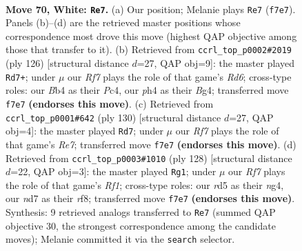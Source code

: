 \documentclass[11pt]{article}
\begin{document}
\clearpage

\begin{figure}[p]\centering
\begin{subfigure}{0.46\textwidth}\centering
\resizebox{\linewidth}{!}{%
\newchessgame
\chessboard[
  setfen={6k1/3n1R2/8/3r4/pB3P1p/P6P/4K3/8 w - - 3 70},
  showmover=false,
  pgfstyle=straightmove, color=movearrow, markmove={f7-e7}
]}
\caption{}
\end{subfigure}\hfill
\begin{subfigure}{0.46\textwidth}\centering
\resizebox{\linewidth}{!}{%
\newchessgame
\chessboard[
  setfen={1r1n4/5k2/3R4/p1p1P3/2P3B1/1P4P1/6K1/8 w - - 1 64},
  showmover=false,
  pgfstyle=straightmove, color=movearrow, markmove={d6-d7}
]}
\caption{}
\end{subfigure}
\\[4pt]
\begin{subfigure}{0.46\textwidth}\centering
\resizebox{\linewidth}{!}{%
\newchessgame
\chessboard[
  setfen={7k/4R2p/3n2p1/8/3r2PP/5P1K/4B3/8 w - - 1 66},
  showmover=false,
  pgfstyle=straightmove, color=movearrow, markmove={e7-d7}
]}
\caption{}
\end{subfigure}\hfill
\begin{subfigure}{0.46\textwidth}\centering
\resizebox{\linewidth}{!}{%
\newchessgame
\chessboard[
  setfen={5r2/1K2k1p1/4P3/7P/1p4n1/1Bp5/P7/5R2 w - - 2 65},
  showmover=false,
  pgfstyle=straightmove, color=movearrow, markmove={f1-g1}
]}
\caption{}
\end{subfigure}
\caption{\textbf{Move 70, White: \texttt{Re7}.} (a) Our position; Melanie plays \texttt{Re7} (\texttt{f7e7}). Panels (b)--(d) are the retrieved master positions whose correspondence most drove this move (highest QAP objective among those that transfer to it). (b) Retrieved from \texttt{ccrl\_top\_p0002\#2019} (ply 126) [structural distance $d$=27, QAP obj=9]: the master played \texttt{Rd7+}; under $\mu$ our \emph{Rf7} plays the role of that game's \emph{Rd6}; cross-type roles: our \emph{B}b4 as their \emph{P}c4, our \emph{p}h4 as their \emph{B}g4; transferred move \texttt{f7e7} \textbf{(endorses this move)}. (c) Retrieved from \texttt{ccrl\_top\_p0001\#642} (ply 130) [structural distance $d$=27, QAP obj=4]: the master played \texttt{Rd7}; under $\mu$ our \emph{Rf7} plays the role of that game's \emph{Re7}; transferred move \texttt{f7e7} \textbf{(endorses this move)}. (d) Retrieved from \texttt{ccrl\_top\_p0003\#1010} (ply 128) [structural distance $d$=22, QAP obj=3]: the master played \texttt{Rg1}; under $\mu$ our \emph{Rf7} plays the role of that game's \emph{Rf1}; cross-type roles: our \emph{r}d5 as their \emph{n}g4, our \emph{n}d7 as their \emph{r}f8; transferred move \texttt{f7e7} \textbf{(endorses this move)}. Synthesis: 9 retrieved analogs transferred to \texttt{Re7} (summed QAP objective 30, the strongest correspondence among the candidate moves); Melanie committed it via the \texttt{search} selector.}
\label{fig:thought-m138}
\end{figure}
\end{document}
